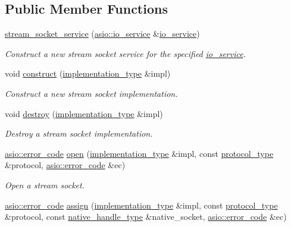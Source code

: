 \subsection*{Public Member Functions}
\begin{DoxyCompactItemize}
\item 
\hyperlink{classasio_1_1stream__socket__service_a6ffeedb6ceb7153021e671d58edd61ff}{stream\+\_\+socket\+\_\+service} (\hyperlink{classasio_1_1io__service}{asio\+::io\+\_\+service} \&\hyperlink{classasio_1_1io__service}{io\+\_\+service})
\begin{DoxyCompactList}\small\item\em Construct a new stream socket service for the specified \hyperlink{classasio_1_1io__service}{io\+\_\+service}. \end{DoxyCompactList}\item 
void \hyperlink{classasio_1_1stream__socket__service_a00abbf7fa5581e6004a4469c8f2ef655}{construct} (\hyperlink{classasio_1_1stream__socket__service_a3e2c55b4aaf6bab6dfa83c8dbf5b236a}{implementation\+\_\+type} \&impl)
\begin{DoxyCompactList}\small\item\em Construct a new stream socket implementation. \end{DoxyCompactList}\item 
void \hyperlink{classasio_1_1stream__socket__service_a9c83520f0a76f38ce9b566f99cbee492}{destroy} (\hyperlink{classasio_1_1stream__socket__service_a3e2c55b4aaf6bab6dfa83c8dbf5b236a}{implementation\+\_\+type} \&impl)
\begin{DoxyCompactList}\small\item\em Destroy a stream socket implementation. \end{DoxyCompactList}\item 
\hyperlink{classasio_1_1error__code}{asio\+::error\+\_\+code} \hyperlink{classasio_1_1stream__socket__service_a4d94e46321b2f71929a641ddb4f31409}{open} (\hyperlink{classasio_1_1stream__socket__service_a3e2c55b4aaf6bab6dfa83c8dbf5b236a}{implementation\+\_\+type} \&impl, const \hyperlink{classasio_1_1stream__socket__service_ab2ab14d6b8097da11777751e3164ec92}{protocol\+\_\+type} \&protocol, \hyperlink{classasio_1_1error__code}{asio\+::error\+\_\+code} \&ec)
\begin{DoxyCompactList}\small\item\em Open a stream socket. \end{DoxyCompactList}\item 
\hyperlink{classasio_1_1error__code}{asio\+::error\+\_\+code} \hyperlink{classasio_1_1stream__socket__service_aacea82009faa6a9544b1d403022378fa}{assign} (\hyperlink{classasio_1_1stream__socket__service_a3e2c55b4aaf6bab6dfa83c8dbf5b236a}{implementation\+\_\+type} \&impl, const \hyperlink{classasio_1_1stream__socket__service_ab2ab14d6b8097da11777751e3164ec92}{protocol\+\_\+type} \&protocol, const \hyperlink{classasio_1_1stream__socket__service_a357418641fad207a19bade585d086876}{native\+\_\+handle\+\_\+type} \&native\+\_\+socket, \hyperlink{classasio_1_1error__code}{asio\+::error\+\_\+code} \&ec)

\end{DoxyCompactItemize}
